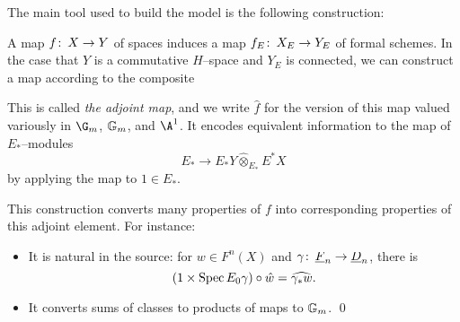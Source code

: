 The main tool used to build the model is the following construction:
\begin{definition}
A map $f\colon\thinspace X \to Y$ of spaces induces a map $f_E \colon\thinspace X_E \to Y_E$ of formal schemes.  In the case that $Y$ is a commutative $H$--space and $Y_E$ is connected, we can construct a map according to the composite
\begin{center}
\end{center}
This is called \textit{the adjoint map}, and we write $\hat f$ for the version of this map valued variously in $\G_m$, $\mathbb G_m$, and $\A^1$.  It encodes equivalent information to the map of $E_*$--modules \[E_* \to E_* Y \widehat\otimes_{E_*} E^* X\] by applying the map to $1 \in E_*$.
\end{definition}

\begin{lemma}
This construction converts many properties of $f$ into corresponding properties of this adjoint element.  For instance:
\begin{itemize}
\item It is natural in the source: for $w \in F^n(X)$ and $\gamma\colon\thinspace \underline{\smash{F}}_{n} \to \underline{\smash{D}}_{n}$, there is \[(1 \times \operatorname{Spec} E_0 \gamma) \circ \hat w = \widehat{\gamma_* w}.\] 
\item It converts sums of classes to products of maps to $\mathbb G_m$. 
\qed
\end{itemize}
\end{lemma}

